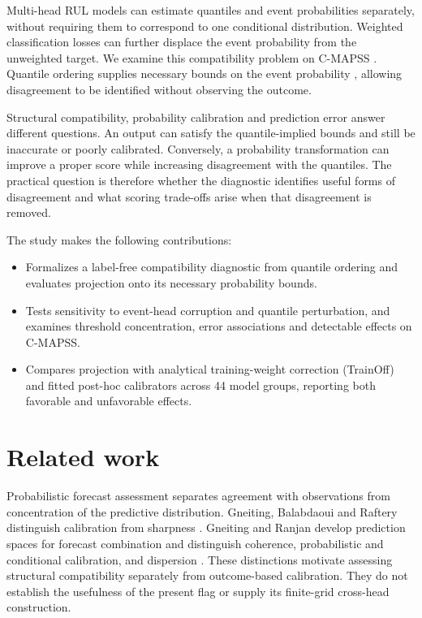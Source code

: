 \documentclass[IJPHM, 2026, 0]{phmsociety}
\providecommand{\tightlist}{\setlength{\itemsep}{0pt}\setlength{\parskip}{0pt}}
\begin{document}
Multi-head RUL models can estimate quantiles and event probabilities separately, without requiring them to correspond to one conditional distribution. Weighted classification losses can further displace the event probability from the unweighted target. We examine this compatibility problem on C-MAPSS \cite{saxena2008cmapss, saxena2008damage}. Quantile ordering supplies necessary bounds on the event probability \cite{koenker1978regression}, allowing disagreement to be identified without observing the outcome.

Structural compatibility, probability calibration and prediction error answer different questions. An output can satisfy the quantile-implied bounds and still be inaccurate or poorly calibrated. Conversely, a probability transformation can improve a proper score while increasing disagreement with the quantiles. The practical question is therefore whether the diagnostic identifies useful forms of disagreement and what scoring trade-offs arise when that disagreement is removed.

The study makes the following contributions:

\begin{itemize}
\tightlist
\item
  Formalizes a label-free compatibility diagnostic from quantile ordering and evaluates projection onto its necessary probability bounds.
\item
  Tests sensitivity to event-head corruption and quantile perturbation, and examines threshold concentration, error associations and detectable effects on C-MAPSS.
\item
  Compares projection with analytical training-weight correction (TrainOff) and fitted post-hoc calibrators across \mbox{44} model groups, reporting both favorable and unfavorable effects.
\end{itemize}

\section{Related work}

Probabilistic forecast assessment separates agreement with observations from concentration of the predictive distribution. Gneiting, Balabdaoui and Raftery distinguish calibration from sharpness \cite{gneiting2007calibrationsharpness}. Gneiting and Ranjan develop prediction spaces for forecast combination and distinguish coherence, probabilistic and conditional calibration, and dispersion \cite{gneiting2013combining}. These distinctions motivate assessing structural compatibility separately from outcome-based calibration. They do not establish the usefulness of the present flag or supply its finite-grid cross-head construction.
\end{document}
